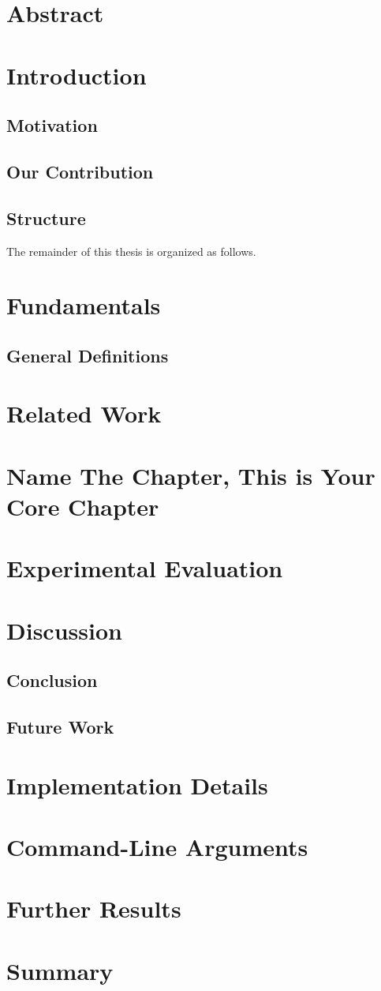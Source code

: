 \documentclass[a4paper,12pt,bibtotoc,titlepage, liststotoc,BCOR7mm,headsepline,pointlessnumbers]{scrbook}
\theoremstyle{break} %
\begin{document}
\upbauthor

\pagebreak
	
\chapter*{Abstract}
	
	\tableofcontents
	
	\mainmatter
	\newpage
\chapter{Introduction}
\section{Motivation}
\section{Our Contribution}
\section{Structure}
The remainder of this thesis is organized as follows.
	\newpage
\chapter{Fundamentals}
\section{General Definitions}
\chapter{Related Work}
\chapter{Name The Chapter, This is Your Core Chapter}
\chapter{Experimental Evaluation}
\chapter{Discussion}
\section{Conclusion}
\section{Future Work}
\appendix
\chapter*{Implementation Details}
\chapter*{Command-Line Arguments}
\chapter*{Further Results}
\chapter*{Summary}
\newpage
\backmatter


\end{document}
